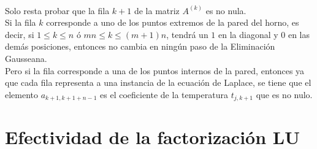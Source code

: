 \documentclass[12pt]{article}
\newcommand{\sub}[3]{\ensuremath{#1_{#2,#3}}}
\begin{document}
\begin{itemize}

\paragraph{} Solo resta probar que la fila \(k+1\) de la matriz \(A^{(k)}\) es no nula. \\
Si la fila $k$ corresponde a uno de los puntos extremos de la pared del horno, es decir, si \(1 \leq k \leq n \text{ ó } mn \leq k \leq (m+1)n\), tendrá un $1$ en la diagonal y $0$ en las demás posiciones, entonces no cambia en ningún paso de la Eliminación Gausseana. \\
Pero si la fila corresponde a una de los puntos internos de la pared, entonces ya que cada fila representa a una instancia de la ecuación de Laplace, se tiene que el elemento \(\sub{a}{k+1}{k+1+n-1}\) es el coeficiente de la temperatura \(\sub{t}{j}{k+1}\) que es no nulo. %

\end{itemize}

\section{Efectividad de la factorización LU}
\end{document}
